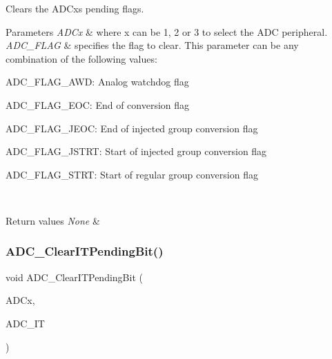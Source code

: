Clears the A\+D\+Cx\textquotesingle{}s pending flags. 


\begin{DoxyParams}{Parameters}
{\em A\+D\+Cx} & where x can be 1, 2 or 3 to select the A\+DC peripheral. \\
\hline
{\em A\+D\+C\+\_\+\+F\+L\+AG} & specifies the flag to clear. This parameter can be any combination of the following values\+: \begin{DoxyItemize}
\item A\+D\+C\+\_\+\+F\+L\+A\+G\+\_\+\+A\+WD\+: Analog watchdog flag \item A\+D\+C\+\_\+\+F\+L\+A\+G\+\_\+\+E\+OC\+: End of conversion flag \item A\+D\+C\+\_\+\+F\+L\+A\+G\+\_\+\+J\+E\+OC\+: End of injected group conversion flag \item A\+D\+C\+\_\+\+F\+L\+A\+G\+\_\+\+J\+S\+T\+RT\+: Start of injected group conversion flag \item A\+D\+C\+\_\+\+F\+L\+A\+G\+\_\+\+S\+T\+RT\+: Start of regular group conversion flag \end{DoxyItemize}
\\
\hline
\end{DoxyParams}

\begin{DoxyRetVals}{Return values}
{\em None} & \\
\hline
\end{DoxyRetVals}
\mbox{\label{group___a_d_c___exported___functions_ga601c6a67bd883eb631ecc7aa5e999b9c}} 
\subsubsection{\texorpdfstring{ADC\_ClearITPendingBit()}{ADC\_ClearITPendingBit()}}
{\footnotesize\ttfamily void A\+D\+C\+\_\+\+Clear\+I\+T\+Pending\+Bit (\begin{DoxyParamCaption}\item[{\mbox{\hyperlink{struct_a_d_c___type_def}{A\+D\+C\+\_\+\+Type\+Def}} $\ast$}]{A\+D\+Cx,  }\item[{uint16\+\_\+t}]{A\+D\+C\+\_\+\+IT }\end{DoxyParamCaption})}



